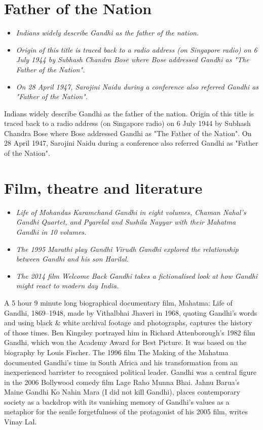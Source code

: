 \section{Father of the Nation}\label{father-of-the-nation}

\begin{itemize}
\item
  \emph{Indians widely describe Gandhi as the father of the nation.}
\item
  \emph{Origin of this title is traced back to a radio address (on
  Singapore radio) on 6 July 1944 by Subhash Chandra Bose where Bose
  addressed Gandhi as "The Father of the Nation".}
\item
  \emph{On 28 April 1947, Sarojini Naidu during a conference also
  referred Gandhi as "Father of the Nation".}
\end{itemize}

Indians widely describe Gandhi as the father of the nation. Origin of
this title is traced back to a radio address (on Singapore radio) on 6
July 1944 by Subhash Chandra Bose where Bose addressed Gandhi as "The
Father of the Nation". On 28 April 1947, Sarojini Naidu during a
conference also referred Gandhi as "Father of the Nation".

\section{Film, theatre and
literature}\label{film-theatre-and-literature}

\begin{itemize}
\item
  \emph{Life of Mohandas Karamchand Gandhi in eight volumes, Chaman
  Nahal's Gandhi Quartet, and Pyarelal and Sushila Nayyar with their
  Mahatma Gandhi in 10 volumes.}
\item
  \emph{The 1995 Marathi play Gandhi Virudh Gandhi explored the
  relationship between Gandhi and his son Harilal.}
\item
  \emph{The 2014 film Welcome Back Gandhi takes a fictionalised look at
  how Gandhi might react to modern day India.}
\end{itemize}

A 5 hour 9 minute long biographical documentary film, Mahatma: Life of
Gandhi, 1869--1948, made by Vithalbhai Jhaveri in 1968, quoting Gandhi's
words and using black \& white archival footage and photographs,
captures the history of those times. Ben Kingsley portrayed him in
Richard Attenborough's 1982 film Gandhi, which won the Academy Award for
Best Picture. It was based on the biography by Louis Fischer. The 1996
film The Making of the Mahatma documented Gandhi's time in South Africa
and his transformation from an inexperienced barrister to recognised
political leader. Gandhi was a central figure in the 2006 Bollywood
comedy film Lage Raho Munna Bhai. Jahnu Barua's Maine Gandhi Ko Nahin
Mara (I did not kill Gandhi), places contemporary society as a backdrop
with its vanishing memory of Gandhi's values as a metaphor for the
senile forgetfulness of the protagonist of his 2005 film, writes Vinay
Lal.

